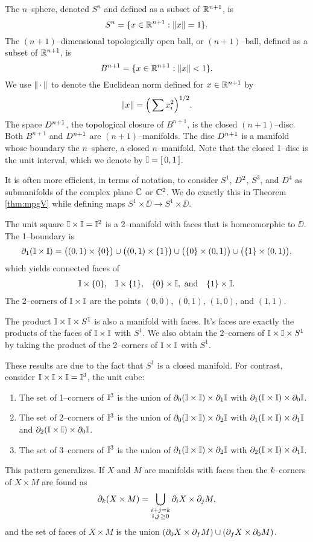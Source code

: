 \begin{ex}
	The $n$--sphere, denoted $S^n$ and defined as a subset of $\mathbb{R}^{n+1}$, is
	\[
	S^n = \{x\in\mathbb{R}^{n+1}:\left\lVert x \right\rVert=1\}.
	\]
	The $(n+1)$--dimensional topologically open ball, or $(n+1)$--ball, defined as a subset of $\mathbb{R}^{n+1}$, is
	\[
	B^{n+1} = \{x\in\mathbb{R}^{n+1}:\left\lVert x \right\rVert< 1\}.
	\]
	We use $\left\lVert \,\cdot\, \right\rVert$ to denote the Euclidean norm defined for $x\in\mathbb{R}^{n+1}$ by
	\[
	\left\lVert x \right\rVert = \Big( \sum x_i^2 \Big)^{1/2}.
	\]
	The space $D^{n+1}$, the topological closure of $B^{n+1}$, is the closed $(n+1)$--disc.
	Both $B^{n+1}$ and $D^{n+1}$ are $(n+1)$--manifolds.
	The disc $D^{n+1}$ is a manifold whose boundary the $n$--sphere, a closed $n$--manifold.
	Note that the closed 1--disc is the unit interval, which we denote by $\mathbb{I}=[\,0,1\,]$.
	
	It is often more efficient, in terms of notation, to consider $S^1$, $D^2$, $S^3$, and $D^4$ as submanifolds of the complex plane $\mathbb{C}$ or $\mathbb{C}^2$.
	We do exactly this in Theorem \ref{thm:mpgV} while defining maps $S^1\times\DD\to S^1\times\DD$.
\end{ex}

\begin{ex}
	The unit square $\mathbb{I}\times \mathbb{I}=\mathbb{I}^2$ is a 2--manifold with faces that is homeomorphic to $\DD$.
	The 1--boundary is 
	\[\partial_1(\mathbb{I}\times\mathbb{I}) = \big((0,1)\times\{0\}\big)\cup\big((0,1)\times\{1\}\big)\cup\big(\{0\}\times(0,1)\big)\cup\big(\{1\}\times(0,1)\big),\]
	which yields connected faces of
	\[
		\begin{array}{cccc}
			\mathbb{I}\times\{0\}, & \mathbb{I}\times\{1\}, & \{0\}\times\mathbb{I}, \textmd{ and}&\{1\}\times\mathbb{I}.
		\end{array}
	\]
	The 2--corners of $\mathbb{I}\times\mathbb{I}$ are the points $(0,0)$, $(0,1)$, $(1,0)$, and $(1,1)$.

	The product $\mathbb{I}\times\mathbb{I}\times S^1$ is also a manifold with faces.
	It's faces are exactly the products of the faces of $\mathbb{I}\times\mathbb{I}$ with $S^1$.
	We also obtain the 2--corners of $\mathbb{I}\times\mathbb{I}\times S^1$ by taking the product of the 2--corners of $\mathbb{I}\times\mathbb{I}$ with $S^1$.
	
	These results are due to the fact that $S^1$ is a closed manifold.
	For contrast, consider $\mathbb{I}\times\mathbb{I}\times\mathbb{I}=\mathbb{I}^3$, the unit cube:
	\begin{enumerate}
		\item The set of 1--corners of $\mathbb{I}^3$ is the union of $\partial_0(\mathbb{I}\times\mathbb{I})\times\partial_1\mathbb{I}$ with $\partial_1(\mathbb{I}\times\mathbb{I})\times\partial_0\mathbb{I}$.
		\item The set of 2--corners of $\mathbb{I}^3$ is the union of $\partial_0(\mathbb{I}\times\mathbb{I})\times\partial_2\mathbb{I}$ with $\partial_1(\mathbb{I}\times\mathbb{I})\times\partial_1\mathbb{I}$ and $\partial_2(\mathbb{I}\times\mathbb{I})\times\partial_0\mathbb{I}$.
		\item The set of 3--corners of $\mathbb{I}^3$ is the union of $\partial_1(\mathbb{I}\times\mathbb{I})\times\partial_2\mathbb{I}$ with $\partial_2(\mathbb{I}\times\mathbb{I})\times\partial_1\mathbb{I}$.
	\end{enumerate}	
	This pattern generalizes.
	If $X$ and $M$ are manifolds with faces then the $k$--corners of $X\times M$ are found as
	\[
		\partial_k(X\times M) = \bigcup_{\substack{i+j=k\\i,j\,\geq0}} \partial_i X\times \partial_j M,
	\]
	and the set of faces of $X\times M$ is the union $(\partial_0 X\times\partial_f M)\cup(\partial_f X\times\partial_0 M)$.
\end{ex}

